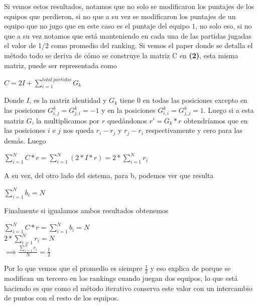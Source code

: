 Si vemos estos resultados, notamos que no solo se modificaron los puntajes de los equipos que perdieron, si no que a su vez se modificaron los puntajes de un equipo que no jugo que en este caso es el puntaje del equipo $1$, no solo eso, si no que a su vez notamos que está manteniendo en cada una de las partidas jugadas el valor de 1/2 como promedio del ranking.
Si vemos el paper donde se detalla el método todo se deriva de cómo se construye la matriz C en \textbf{(2)}, esta misma matriz, puede ser representada como \\

\begin{center}
$C = 2I+\displaystyle\sum_{i=1}^{total\ partidos}G_k$
\end{center}

Donde $I$, es la matriz identidad y $G_k$ tiene 0 en todas las posiciones excepto en las posiciones $G_{i,j}^k = G_{j,i}^k = -1$ y en la posiciones $G_{i,i}^k = G_{j,j}^k = 1$. Luego si a esta matriz $G$, la multiplicamos por $r$ quedándonos $r'=G_k*r$  obtendríamos que en las posiciones $i$ e $j$ nos queda $r_i-r_j$ y $r_j-r_i$ respectivamente y cero para las demás. Luego 
 
\begin{center}
$\displaystyle\sum_{i=1}^{N}C*r = \displaystyle\sum_{i=1}^{N}(2*I*r) = 2*\displaystyle\sum_{i=1}^{N} r_i$
\end{center}

A su vez, del otro lado del sistema, para b, podemos ver que resulta

\begin{center}
$\displaystyle\sum_{i=1}^{N}b_i = N$
\end{center}

Finalmente si igualamos ambos resultados obtenemos

\begin{center}
$\displaystyle\sum_{i=1}^{N}C*r = \displaystyle\sum_{i=1}^{N}b_i = N$\\
$2*\displaystyle\sum_{i=1}^{N} r_i = N$\\
$\implies \frac{\displaystyle\sum_{i=1}^{N} r_i}{N} = \frac{1}{2}$\\
\end{center}

Por lo que vemos que el promedio es siempre $\frac{1}{2}$ y eso explica de porque se modifican un tercero en los rankings cuando juegan dos equipos, lo que está haciendo es que como el método iterativo conserva este valor con un intercambio de puntos con el resto de los equipos.

